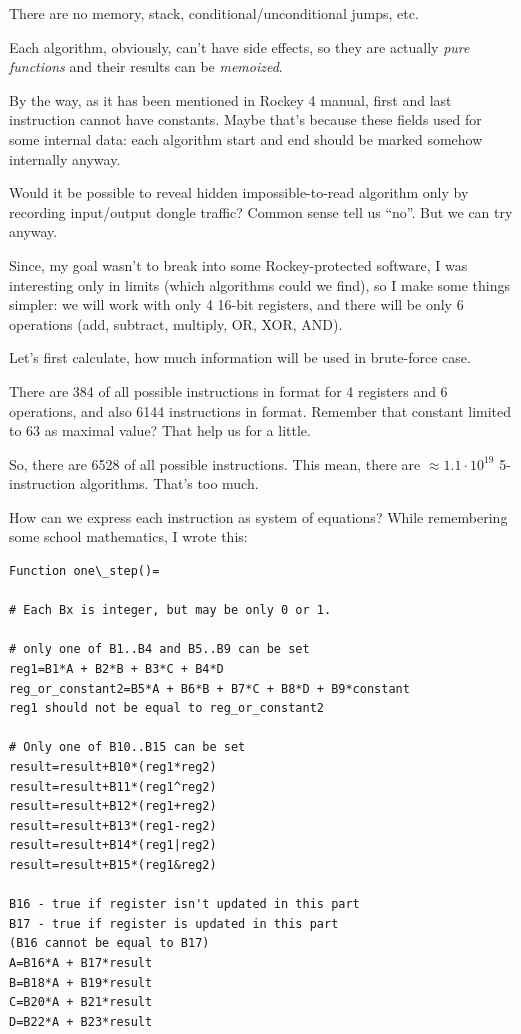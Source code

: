 There are no memory, stack, conditional/unconditional jumps, etc.

Each algorithm, obviously, can't have side effects, so they are actually \emph{pure functions}
and their results can be \emph{memoized}.

By the way, as it has been mentioned in Rockey 4 manual, first and last instruction cannot have constants.
Maybe that's because these fields used for some internal data:
each algorithm start and end should be marked somehow internally anyway.

Would it be possible to reveal hidden impossible-to-read algorithm only by recording input/output dongle traffic?
Common sense tell us ``no''. But we can try anyway.

Since, my goal wasn't to break into some Rockey-protected software,
I was interesting only in limits (which algorithms could we find),
so I make some things simpler: we will work with only 4 16-bit registers,
and there will be only 6 operations (add, subtract, multiply, OR, XOR, AND).

Let's first calculate, how much information will be used in brute-force case.

There are 384 of all possible instructions in  format for 4 registers and 6 operations,
and also 6144 instructions in  format.
Remember that constant limited to 63 as maximal value? That help us for a little.

So, there are 6528 of all possible instructions.
This mean, there are $\approx 1.1 \cdot 10^{19}$ 5-instruction algorithms.
That's too much.

How can we express each instruction as system of equations?
While remembering some school mathematics, I wrote this:

\begin{lstlisting}
Function one\_step()=

# Each Bx is integer, but may be only 0 or 1.

# only one of B1..B4 and B5..B9 can be set
reg1=B1*A + B2*B + B3*C + B4*D
reg_or_constant2=B5*A + B6*B + B7*C + B8*D + B9*constant
reg1 should not be equal to reg_or_constant2

# Only one of B10..B15 can be set
result=result+B10*(reg1*reg2)
result=result+B11*(reg1^reg2)
result=result+B12*(reg1+reg2)
result=result+B13*(reg1-reg2)
result=result+B14*(reg1|reg2)
result=result+B15*(reg1&reg2)

B16 - true if register isn't updated in this part
B17 - true if register is updated in this part
(B16 cannot be equal to B17)
A=B16*A + B17*result
B=B18*A + B19*result
C=B20*A + B21*result
D=B22*A + B23*result
\end{lstlisting}

